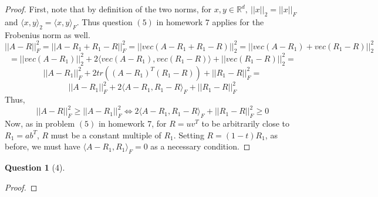\documentclass[11pt]{article}
\theoremstyle{quest}
\newtheorem*{question}{Question}
\begin{document}
\begin{proof}
First, note that by definition of the two norms, for $x,y \in \mathbb{R}^d,\ ||x||_2 = ||x||_F$ and $\langle x,y \rangle_2 = \langle x,y \rangle_F$. Thus question $(5)$ in homework $7$ applies for the Frobenius norm as well.
$$||A-R||_F^2 = ||A-R_1+R_1-R||_F^2 = ||vec(A-R_1+R_1-R)||_2^2 = ||vec(A-R_1)+vec(R_1-R)||_2^2$$
$$=||vec(A-R_1)||_2^2 + 2\langle vec(A-R_1), vec(R_1-R) \rangle + ||vec(R_1-R)||_2^2 =$$
$$||A-R_1||_F^2 + 2tr((A-R_1)^T(R_1-R)) + ||R_1-R||_F^2 =$$
$$||A-R_1||_F^2 + 2\langle A-R_1, R_1-R\rangle_F + ||R_1-R||_F^2$$
Thus,
$$||A-R||_F^2 \ge ||A-R_1||_F^2 \iff 2\langle A-R_1, R_1-R\rangle_F + ||R_1-R||_F^2 \ge 0$$
Now, as in problem $(5)$ in homework $7$, for $R = uv^T$ to be arbitrarily close to $R_1 = ab^T$, $R$ must be a constant multiple of $R_1$. Setting $R = (1-t)R_1$, as before, we must have $\langle A-R_1, R_1 \rangle_F = 0$ as a necessary condition.
\end{proof}

\begin{question}[4]

\end{question}
\begin{proof}

\end{proof}
\end{document}

